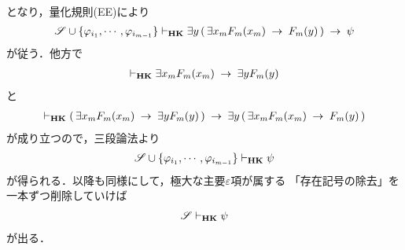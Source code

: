 \begin{description}
\begin{align}
			\end{align}
			となり，量化規則(EE)により
			\begin{align}
				\mathscr{S} \cup \{\varphi_{i_{1}},\cdots,\varphi_{i_{m-1}}\} 
				\vdash_{{\scriptsize \mbox{{\bf HK}}}} 
				\exists y\, (\, \exists x_{m} F_{m}(x_{m}) \hspace{0.25em}\rightarrow\hspace{0.25em} F_{m}(y)\, ) \hspace{0.25em}\rightarrow\hspace{0.25em} \psi
			\end{align}
			が従う．他方で
			\begin{align}
				\vdash_{{\scriptsize \mbox{{\bf HK}}}} \exists x_{m} F_{m}(x_{m}) 
				\hspace{0.25em}\rightarrow\hspace{0.25em} \exists y F_{m}(y)
			\end{align}
			と
			\begin{align}
				\vdash_{{\scriptsize \mbox{{\bf HK}}}} 
				(\, \exists x_{m} F_{m}(x_{m}) \hspace{0.25em}\rightarrow\hspace{0.25em} \exists y F_{m}(y)\, )
				\hspace{0.25em}\rightarrow\hspace{0.25em} \exists y\, (\, \exists x_{m} F_{m}(x_{m}) \hspace{0.25em}\rightarrow\hspace{0.25em} F_{m}(y)\, )
			\end{align}
			が成り立つので，三段論法より
			\begin{align}
				\mathscr{S} \cup \{\varphi_{i_{1}},\cdots,\varphi_{i_{m-1}}\} 
				\vdash_{{\scriptsize \mbox{{\bf HK}}}} \psi
			\end{align}
			が得られる．以降も同様にして，極大な主要$\varepsilon$項が属する
			「存在記号の除去」を一本ずつ削除していけば
			\begin{align}
				\mathscr{S} \vdash_{{\scriptsize \mbox{{\bf HK}}}} \psi
			\end{align}
			が出る．
			\QED
	\end{description}